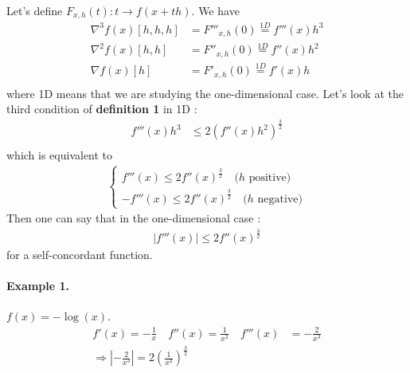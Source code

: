 Let's define $F_{x,h}(t) : t \rightarrow f(x+th)$. We have
\begin{align*}
\nabla^3 f(x)[h,h,h] & = F'''_{x,h}(0) \stackrel{1D}{=} f'''(x)h^3 \\
\nabla^2 f(x)[h,h] & = F''_{x,h}(0) \stackrel{1D}{=} f''(x)h^2\\
\nabla f(x)[h] & = F'_{x,h}(0) \stackrel{1D}{=} f'(x)h\\
\end{align*}
where 1D means that we are studying the one-dimensional case. Let's look at the third condition of \textbf{definition 1} in 1D :
\begin{align*}
f'''(x)h^3 & \le 2 (f''(x)h^2)^\frac{3}{2} \\
\end{align*}
which is equivalent to
\begin{align*}
\left\{
\begin{aligned}
f'''(x) \le 2f''(x)^\frac{3}{2} \quad \text{($h$ positive)} \\
-f'''(x) \le 2f''(x)^\frac{3}{2} \quad \text{($h$ negative)}
\end{aligned}
\right.
\end{align*}
Then one can say that in the one-dimensional case :
\begin{align*}
|f'''(x)| \le 2f''(x)^\frac{3}{2}
\end{align*}
for a self-concordant function.
\paragraph{Example 1.} $f(x) = -\log{(x)}$. 
\begin{align*}
f'(x) = -\frac{1}{x} \quad f''(x) = \frac{1}{x^2} \quad f'''(x) & = -\frac{2}{x^3} \\
\Rightarrow \left|-\frac{2}{x^3}\right| = 2 \left(\frac{1}{x^2}\right)^\frac{3}{2}
\end{align*}

